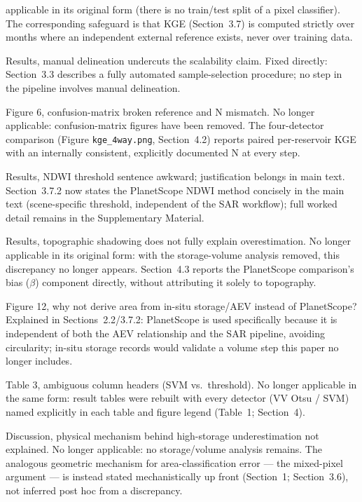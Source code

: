 \documentclass[11pt]{article}
\begin{document}
\begin{resp}
  applicable in its original form (there is no train/test split of a pixel
  classifier). The corresponding safeguard is that KGE (Section~3.7) is
  computed strictly over months where an independent external reference
  exists, never over training data.
  \item[Results, manual delineation undercuts the scalability claim.] Fixed
  directly: Section~3.3 describes a fully automated sample-selection
  procedure; no step in the pipeline involves manual delineation.
  \item[Figure 6, confusion-matrix broken reference and N mismatch.] No
  longer applicable: confusion-matrix figures have been removed. The
  four-detector comparison (Figure \texttt{kge\_4way.png}, Section~4.2)
  reports paired per-reservoir KGE with an internally consistent, explicitly
  documented N at every step.
  \item[Results, NDWI threshold sentence awkward; justification belongs in
  main text.] Section~3.7.2 now states the PlanetScope NDWI method concisely
  in the main text (scene-specific threshold, independent of the SAR
  workflow); full worked detail remains in the Supplementary Material.
  \item[Results, topographic shadowing does not fully explain
  overestimation.] No longer applicable in its original form: with the
  storage-volume analysis removed, this discrepancy no longer appears.
  Section~4.3 reports the PlanetScope comparison's bias ($\beta$) component
  directly, without attributing it solely to topography.
  \item[Figure 12, why not derive area from in-situ storage/AEV instead of
  PlanetScope?] Explained in Sections~2.2/3.7.2: PlanetScope is used
  specifically because it is independent of both the AEV relationship and
  the SAR pipeline, avoiding circularity; in-situ storage records would
  validate a volume step this paper no longer includes.
  \item[Table 3, ambiguous column headers (SVM vs.\ threshold).] No longer
  applicable in the same form: result tables were rebuilt with every
  detector (VV Otsu / SVM) named explicitly in each table and figure legend
  (Table~1; Section~4).
  \item[Discussion, physical mechanism behind high-storage underestimation
  not explained.] No longer applicable: no storage/volume analysis remains.
  The analogous geometric mechanism for area-classification error --- the
  mixed-pixel argument --- is instead stated mechanistically up front
  (Section~1; Section~3.6), not inferred post hoc from a discrepancy.

\end{resp}
\end{document}
